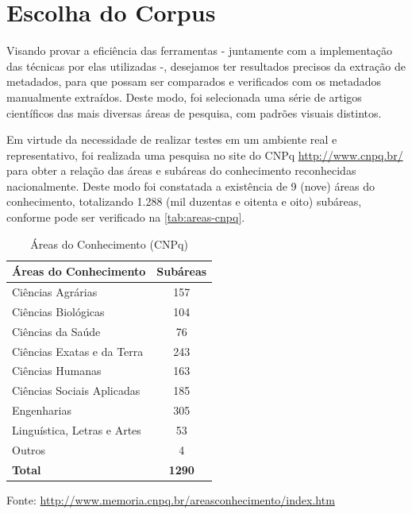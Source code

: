 \section{Escolha do Corpus}
\label{sec:corpus}


Visando provar a eficiência das ferramentas - juntamente com a implementação das técnicas por elas utilizadas -, desejamos ter resultados precisos da extração de metadados, para que possam ser comparados e verificados com os metadados manualmente extraídos. Deste modo, foi selecionada uma série de artigos científicos das mais diversas áreas de pesquisa, com padrões visuais distintos.


Em virtude da necessidade de realizar testes em um ambiente real e representativo, foi realizada uma pesquisa no site do CNPq \url{http://www.cnpq.br/} para obter a relação das áreas e subáreas do conhecimento reconhecidas nacionalmente. Deste modo foi constatada a existência de 9 (nove) áreas do conhecimento, totalizando 1.288 (mil duzentas e oitenta e oito) subáreas, conforme pode ser verificado na \autoref{tab:areas-cnpq}.

\begin{table}
    \caption{Áreas do Conhecimento (CNPq)}
    \begin{center}
        \begin{tabular}{|l|c|}
            \hline 
            \textbf{Áreas do Conhecimento} & \textbf{Subáreas} \\ 
            \hline 
            Ciências Agrárias & 157 \\
            Ciências Biológicas & 104 \\
            Ciências da Saúde & 76 \\
            Ciências Exatas e da Terra & 243 \\
            Ciências Humanas & 163 \\
            Ciências Sociais Aplicadas & 185 \\
            Engenharias & 305 \\
            Linguística, Letras e Artes & 53 \\
            Outros & 4 \\
            \hline
            \textbf{Total} & \textbf{1290} \\
            \hline
        \end{tabular}
    \end{center}
    \center\footnotesize{Fonte: \url{http://www.memoria.cnpq.br/areasconhecimento/index.htm}}
    \label{tab:areas-cnpq}
\end{table}

